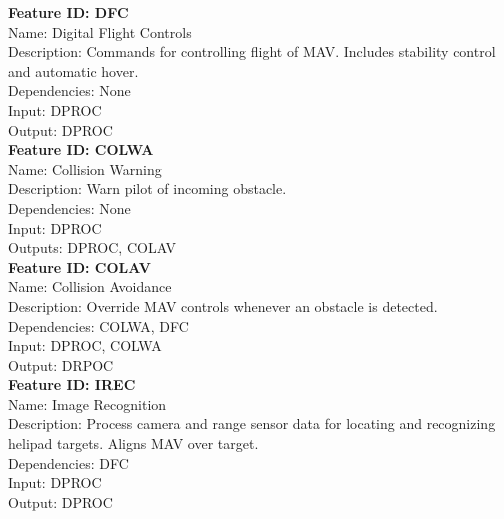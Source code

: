 \documentclass[onecolumn, oneside, letterpaper, draftclsnofoot, 10pt, compsoc]{IEEEtran}
\begin{document}
\noindent
\textbf{Feature ID: DFC}\\
Name: Digital Flight Controls\\
Description: Commands for controlling flight of MAV. Includes stability control and automatic hover.\\
Dependencies: None\\
Input: DPROC\\
Output: DPROC\\

\noindent
\textbf{Feature ID: COLWA}\\
Name: Collision Warning\\
Description: Warn pilot of incoming obstacle.\\
Dependencies: None\\
Input: DPROC\\
Outputs: DPROC, COLAV\\

\noindent
\textbf{Feature ID: COLAV}\\
Name: Collision Avoidance\\
Description: Override MAV controls whenever an obstacle is detected.\\
Dependencies: COLWA, DFC\\
Input: DPROC, COLWA\\
Output: DRPOC\\

\noindent
\textbf{Feature ID: IREC}\\
Name: Image Recognition\\
Description: Process camera and range sensor data for locating and recognizing helipad targets. Aligns MAV over target.\\
Dependencies: DFC\\
Input: DPROC\\
Output: DPROC
\end{document}
